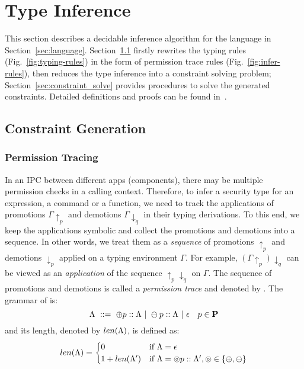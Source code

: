 {{{ \section{Type Inference}\label{sec:constraint_gen}
This section describes a decidable inference algorithm for the language  in Section~\ref{sec:language}.
Section~\ref{sec:constraint-gen-rules} firstly rewrites the typing
rules (Fig.~\ref{fig:typing-rules}) in the form of permission trace
rules (Fig.~\ref{fig:infer-rules}), then reduces the type inference
into a constraint solving problem; Section~\ref{sec:constraint_solve}
provides procedures to solve the generated constraints. Detailed
definitions and proofs can be found in~\cite{Chen17arxiv}.


\subsection{Constraint Generation}\label{sec:constraint-gen-rules}
\subsubsection{\textbf{Permission Tracing}}\label{sec:trace_rules}
In an IPC between different apps (components), there may be multiple permission checks in a calling context.
Therefore, to infer a security type for an expression, a command or a function, we need to track
the applications of promotions $\Gamma\!\uparrow_{p}$ and demotions $\Gamma\!\downarrow_{q}$ in their typing derivations.
To this end,  we keep the applications symbolic and collect the promotions and demotions into a sequence.
In other words, we treat them as a \emph{sequence} of promotions $\uparrow_{p}$ and demotions $\downarrow_{p}$ applied on a typing environment $\Gamma$.
For example, $(\Gamma\!\uparrow_{p})\downarrow_{q}$ can be viewed as
an \emph{application} of the sequence $\uparrow_{p}\downarrow_{q}$ on $\Gamma$.
The sequence of promotions and demotions is called a \emph{permission trace} and denoted by {\trace}. The grammar of {\trace} is:
\begin{equation*}
\Lambda~::=~\oplus p ::\Lambda~|~ \ominus p :: \Lambda~|~ \epsilon
\quad p\in \mathbf{P}
\end{equation*}
and its length, denoted by $len(\Lambda)$, is defined as:
\begin{align*}
	len(\Lambda)=
	\begin{cases}
	    0 & \text{if}~ \Lambda=\epsilon\\
		1+len(\Lambda') & \text{if}~ \Lambda=\circledcirc p :: \Lambda', \circledcirc  \in\{\oplus , \ominus \}
	\end{cases}
\end{align*}

}}}
